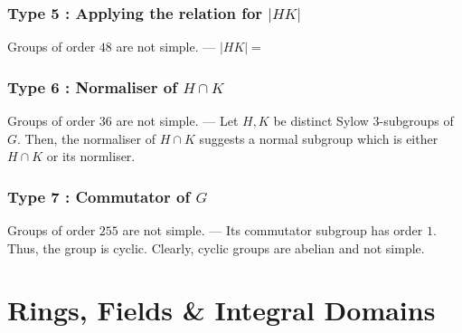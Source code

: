 \subsubsection*{Type 5 : Applying the relation for $|HK|$}
	Groups of order $48$ are not simple. --- $|HK| = $

\subsubsection*{Type 6 : Normaliser of $H \cap K$}
	Groups of order $36$ are not simple. --- Let $H,K$ be distinct Sylow $3$-subgroups of $G$. Then, the normaliser of $H \cap K$ suggests a normal subgroup which is either $H\cap K$ or its normliser.

\subsubsection*{Type 7 : Commutator of $G$}
	Groups of order $255$ are not simple. --- Its commutator subgroup has order $1$. Thus, the group is cyclic. Clearly, cyclic groups are abelian and not simple.

\section{Rings, Fields \& Integral Domains}

